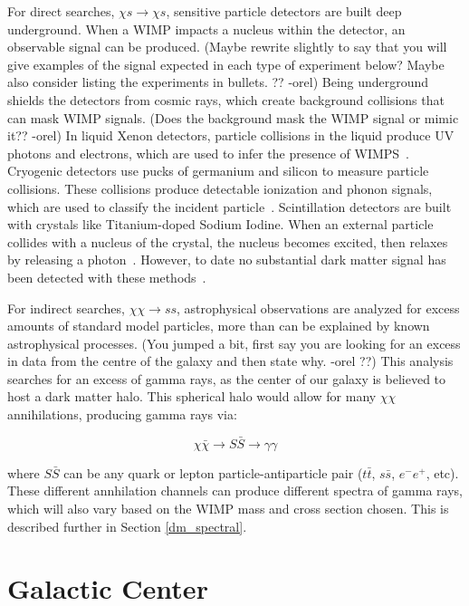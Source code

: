     For direct searches, $\chi s \rightarrow \chi s$, sensitive particle detectors are built deep underground.
    When a WIMP impacts a nucleus within the detector, an observable signal can be produced.
    {\color{red}(Maybe rewrite slightly to say that you will give examples of the signal expected in each type of experiment below?  Maybe also consider listing  the experiments in bullets. ?? -orel)}
    Being underground shields the detectors from cosmic rays, which create background collisions that can mask WIMP signals.
    {\color{red}(Does the background mask the WIMP signal or mimic it?? -orel)}
    In liquid Xenon detectors, particle collisions in the liquid produce UV photons and electrons, which are used to infer the presence of WIMPS~\cite{direct_lux}.
    Cryogenic detectors use pucks of germanium and silicon to measure particle collisions.
    These collisions produce detectable ionization and phonon signals, which are used to classify the incident particle~\cite{direct_cdms}.
    Scintillation detectors are built with crystals like Titanium-doped Sodium Iodine.
    When an external particle collides with a nucleus of the crystal, the nucleus becomes excited, then relaxes by releasing a photon~\cite{direct_dama}.
    However, to date no substantial dark matter signal has been detected with these methods~\cite{direct_dm_detection}.
    
    For indirect searches, $\chi\chi \rightarrow ss$, astrophysical observations are analyzed for excess amounts of standard model particles, more than can be explained by known astrophysical processes.
    {\color{red}(You jumped a bit, first say you are looking for an excess in data from the centre of the galaxy and then state why. -orel ??)}
    This analysis searches for an excess of gamma rays, as the center of our galaxy is believed to host a dark matter halo.
    This spherical halo would allow for many $\chi\chi$ annihilations, producing gamma rays via: 
    
    $$\chi\bar{\chi} \rightarrow S\bar{S} \rightarrow \gamma\gamma$$

    where $S\bar{S}$ can be any quark or lepton particle-antiparticle pair ($t\bar{t}$, $s\bar{s}$, $e^{-}e^{+}$, etc).
    These different annhilation channels can produce different spectra of gamma rays, which will also vary based on the WIMP mass and cross section chosen.
    This is described further in Section \ref{dm_spectral}.

\FloatBarrier

\section{Galactic Center}
  
